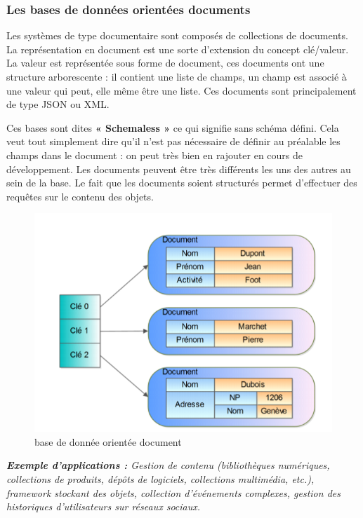 \subsubsection{Les bases de données orientées documents}
Les systèmes de type documentaire sont composés de collections de documents. La représentation en document est une sorte d’extension du concept clé/valeur. La valeur est représentée sous forme de document, ces documents ont une structure arborescente : il contient une liste de champs, un champ est associé à une valeur qui peut, elle même être une liste. Ces documents sont principalement de type JSON ou XML.

Ces bases sont dites \textbf{« Schemaless »} ce qui signifie sans schéma défini. Cela veut tout simplement dire qu’il n’est pas nécessaire de définir au préalable les champs dans le document : on peut très bien en rajouter en cours de développement. Les documents peuvent être très différents les uns des autres au sein de la base. Le fait que les documents soient structurés permet d’effectuer des requêtes sur le contenu des objets.

\begin{figure}[h]
	\centering
    \includegraphics[scale=0.5]{img/4.5}
    \caption{base de donnée orientée document}
\end{figure}

\textit{\textbf{Exemple d'applications :} Gestion de contenu (bibliothèques numériques, collections de produits, dépôts de logiciels, collections multimédia, etc.), framework stockant des objets, collection d'événements complexes, gestion des historiques d'utilisateurs sur réseaux sociaux.}

